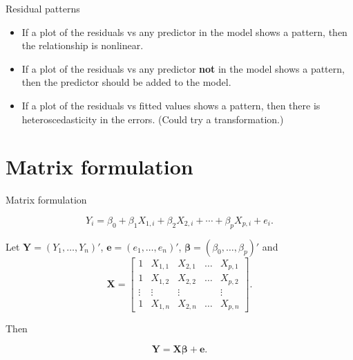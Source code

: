 \documentclass[14pt]{beamer}
\makeatletter
\def\biz{\begin{itemize}[<+-| alert@+>]}
\def\eiz{\end{itemize}}
\makeatother
\begin{document}
\begin{frame}{Residual patterns}

\biz
\item If a plot of the residuals vs any predictor in the model shows a pattern, then the relationship is nonlinear.

\item If a plot of the residuals vs any predictor \textbf{not} in the model shows a pattern, then the predictor should be added to the model.

\item If a plot of the residuals vs fitted values shows a pattern, then there is heteroscedasticity in the errors. (Could try a transformation.)

\eiz
\end{frame}



\section{Matrix formulation}

\begin{frame}{Matrix formulation}

\begin{block}{}\vspace*{-0.3cm}
$$Y_i = \beta_0 + \beta_1 X_{1,i} + \beta_2 X_{2,i} + \cdots + \beta_pX_{p,i} + e_i.$$
\end{block}\pause

Let $\bm{Y} = (Y_1,\dots,Y_n)'$, $\bm{e} = (e_1,\dots,e_n)'$, $\bm{\beta} = (\beta_0,\dots,\beta_p)'$ and
\[
\bm{X} = \begin{bmatrix}
  1 & X_{1,1} & X_{2,1} & \dots & X_{p,1}\\
  1 & X_{1,2} & X_{2,2} & \dots & X_{p,2}\\
\vdots & \vdots & \vdots & & \vdots\\
  1 & X_{1,n} & X_{2,n} & \dots & X_{p,n}
  \end{bmatrix}.
\]\pause

Then
\begin{block}{}\vspace*{-0.35cm}
$$\bm{Y} = \bm{X}\bm{\beta} + \bm{e}.$$
\end{block}
\end{frame}
\end{document}
